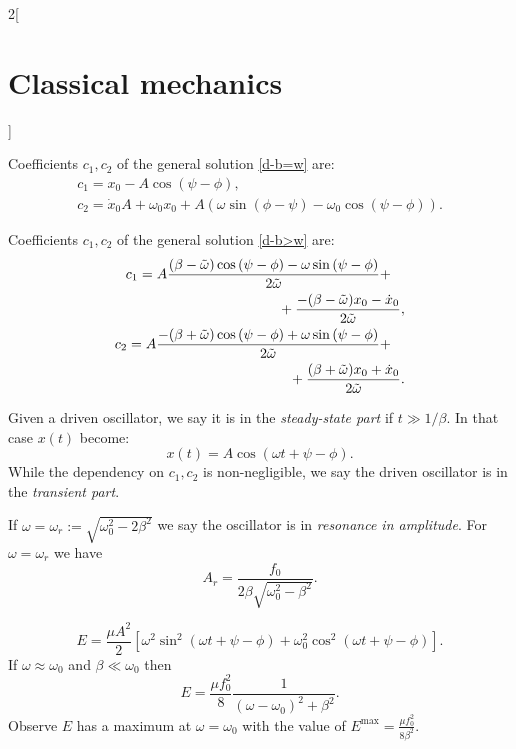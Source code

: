 \documentclass[../../../main.tex]{subfiles}
\begin{document}
\begin{multicols}{2}[\section{Classical mechanics}]
\begin{prop}
    Coefficients $c_1,c_2$ of the general solution \eqref{d-b=w} are:
    \begin{gather*}
      c_1=x_0-A\cos\left(\psi-\phi\right),\\
      c_2=\dot{x}_0A+\omega_0x_0+A\left(\omega\sin\left(\phi-\psi\right)-\omega_0\cos\left(\psi-\phi\right)\right).
    \end{gather*}
  \end{prop}
  \begin{prop}
    Coefficients $c_1,c_2$ of the general solution \eqref{d-b>w} are:
    \begin{equation*}
      \begin{split}
        \begin{multlined}[t]
          c_1=A\frac{(\beta-\Tilde{\omega})\cos\left(\psi-\phi\right)-\omega\sin\left(\psi-\phi\right)}{2\Tilde{\omega}}+\\+\frac{-(\beta-\Tilde{\omega})x_0-\dot{x}_0}{2\Tilde{\omega}},
        \end{multlined}\\
        \begin{multlined}[t]
          c_2=A\frac{-(\beta+\Tilde{\omega})\cos\left(\psi-\phi\right)+\omega\sin\left(\psi-\phi\right)}{2\Tilde{\omega}}+\\+\frac{(\beta+\Tilde{\omega})x_0+\dot{x}_0}{2\Tilde{\omega}}.
        \end{multlined}
      \end{split}
    \end{equation*}
  \end{prop}
  \begin{definition}
    Given a driven oscillator, we say it is in the \textit{steady-state part} if $t\gg 1/\beta$. In that case $x(t)$ become: $$x(t)=A\cos(\omega t+\psi-\phi).$$ While the dependency on $c_1,c_2$ is non-negligible, we say the driven oscillator is in the \textit{transient part}.
  \end{definition}
  \begin{prop}
    If $\omega=\omega_r:=\sqrt{\omega_0^2-2\beta^2}$ we say the oscillator is in \textit{resonance in amplitude}. For $\omega=\omega_r$ we have $$A_r=\frac{f_0}{2\beta\sqrt{\omega_0^2-\beta^2}}.$$
  \end{prop}
  \begin{prop}
    $$E=\frac{\mu A^2}{2}\left[\omega^2\sin^2(\omega t+\psi-\phi)+\omega_0^2\cos^2(\omega t+\psi-\phi)\right].$$ If $\omega\approx\omega_0$ and $\beta\ll\omega_0$ then $$E=\frac{\mu f_0^2}{8}\frac{1}{(\omega-\omega_0)^2+\beta^2}.$$ Observe $E$ has a maximum at $\omega=\omega_0$ with the value of $E^\text{max}=\frac{\mu f_0^2}{8\beta^2}$.

\end{prop}
\end{multicols}
\end{document}

